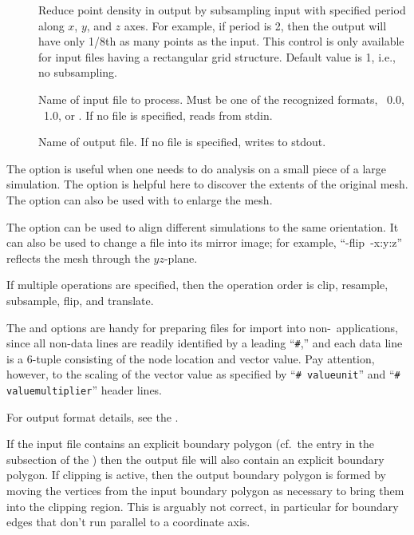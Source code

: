\begin{description}
\item[]
  Reduce point density in output by subsampling input with specified
  period along $x$, $y$, and $z$ axes.  For example, if period is 2,
  then the output will have only 1/8th as many points as the input.
  This control is only available for input files having a rectangular
  grid structure.  Default value is 1, i.e., no subsampling.
\item[]
  Name of input file to process.  Must be one of the recognized formats,
  \OVF\ 0.0, \OVF\ 1.0, or \VIO.  If no file is specified, reads from
  stdin.
\item[]
  Name of output file.  If no file is specified, writes to stdout.
\end{description}

The  option is useful when one needs to do analysis on a
small piece of a large simulation.  The  option is helpful
here to discover the extents of the original mesh.  The 
option can also be used with  to enlarge the mesh.

The  option can be used to align different simulations
to the same orientation.  It can also be used to change a file into its
mirror image; for example, ``-flip~-x:y:z'' reflects the mesh through
the $yz$-plane.

If multiple operations are specified, then the operation order is
clip, resample, subsample, flip, and translate.

The  and  options are handy for
preparing files for import into non-\OOMMF\ applications, since all
non-data lines are readily identified by a leading ``\verb+#+,'' and
each data line is a 6-tuple consisting of the node location and vector
value.  Pay attention, however, to the scaling of the vector value as
specified by ``\verb+# valueunit+'' and ``\verb+# valuemultiplier+''
header lines.

For output format details, see the .


If the input file contains an explicit boundary polygon (cf.\ the
 entry in the  subsection of the {}) then the
output file will also contain an explicit boundary polygon.  If clipping
is active, then the output boundary polygon is formed by moving the
vertices from the input boundary polygon as necessary to bring them into
the clipping region.  This is arguably not correct, in particular for
boundary edges that don't run parallel to a coordinate axis.


